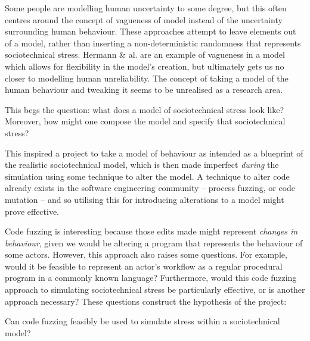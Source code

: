 Some people are modelling human uncertainty to some degree, but this often centres around the concept of vagueness of model instead of the uncertainty surrounding human behaviour. These approaches attempt to leave elements out of a model, rather than inserting a non-deterministic randomness that represents sociotechnical stress. Hermann \& al.\cite{Herrmann1999} are an example of vagueness in a model which allows for flexibility in the model's creation, but ultimately gets us no closer to modelling human unreliability. The concept of taking a model of the human behaviour and tweaking it seems to be unrealised as a research area. \par%

This begs the question: what does a model of sociotechnical stress look like? Moreover, how might one compose the model and specify that sociotechnical stress? \par%

This inspired a project to take a model of behaviour as intended as a blueprint of the realistic sociotechnical model, which is then made imperfect \emph{during} the simulation using some technique to alter the model. A technique to alter code already exists in the software engineering community -- process fuzzing, or code mutation -- and so utilising this for introducing alterations to a model might prove effective. \par%

Code fuzzing is interesting because those edits made might represent \emph{changes in behaviour}, given we would be altering a program that represents the behaviour of some actors. However, this approach also raises some questions. For example, would it be feasible to represent an actor's workflow as a regular procedural program in a commonly known language? Furthermore, would this code fuzzing approach to simulating sociotechnical stress be particularly effective, or is another approach necessary? These questions construct the hypothesis of the project: 
\begin{displayquote}
Can code fuzzing feasibly be used to simulate stress within a sociotechnical model?
\end{displayquote}%


